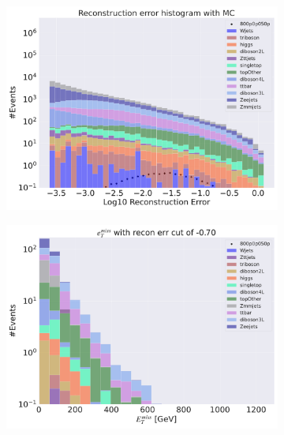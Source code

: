 \begin{figure}[H]
    \centering
    \begin{subfigure}{.49\textwidth}
        \includegraphics[width=\textwidth]{Figures/AE_testing/small/3lep/b_data_recon_big_rm3_feats_sig_800p0p050p.pdf}
        \caption{ }
        \label{fig:AE_3lep_small_800_3}
    \end{subfigure}
    \hfill
    \begin{subfigure}{.49\textwidth}
        \includegraphics[width=\textwidth]{Figures/AE_testing/small/3lep/b_data_recon_big_rm3_feats_sig_800p0p050p_etmiss_recon_errcut_-0.70.pdf}
        \caption{}
        \label{fig:AE_3lep_small_etmiss_800_3}
    \end{subfigure}

\end{figure}
